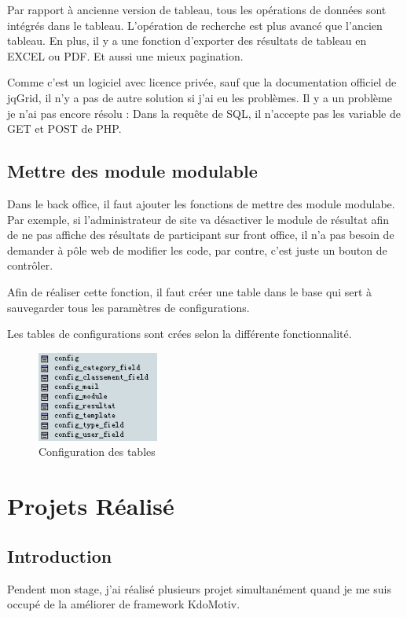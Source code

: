 Par rapport à ancienne version de tableau, tous les opérations de données sont intégrés dans le tableau. L'opération de recherche est plus avancé que l'ancien tableau. En plus, il y a une fonction d'exporter des résultats de tableau en EXCEL ou PDF. Et aussi une mieux pagination.

Comme c'est un logiciel avec licence privée, sauf que la documentation officiel de jqGrid, il n'y a pas de autre solution si j'ai eu les problèmes. Il y a un problème je n'ai pas encore résolu : 
Dans la requête de SQL, il n'accepte pas les variable de GET et POST de PHP. 

\subsection{Mettre des module modulable}
Dans le back office, il faut ajouter les fonctions de mettre des module modulabe. Par exemple, si l'administrateur de site va désactiver le module de résultat afin de ne pas affiche des résultats de participant sur front office, il n'a pas besoin de demander à pôle web de modifier les code, par contre, c'est juste un bouton de contrôler. 

Afin de réaliser cette fonction, il faut créer une table dans le base qui sert à sauvegarder tous les paramètres de configurations.  

Les tables de configurations sont crées selon la différente fonctionnalité. 
\begin{figure}[hbtp]
\centering
\includegraphics[width=4cm]{body/images/config.png}
\caption{Configuration des tables}
\end{figure}



 
	
\newpage
\section{Projets Réalisé}
\subsection{Introduction}
Pendent mon stage,  j'ai réalisé plusieurs projet simultanément quand je me suis occupé de la améliorer de framework KdoMotiv.

